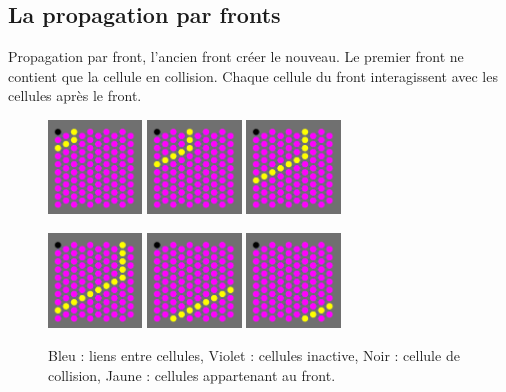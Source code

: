 \documentclass{beamer}
\begin{document}
\subsection{La propagation par fronts}
\begin{frame}
  Propagation par front, l’ancien front créer le nouveau. Le premier front ne contient que la cellule en collision.
  Chaque cellule du front interagissent avec les cellules après le front.
  \begin{figure}
    \begin{center}
      \includegraphics[width=2.5cm]{Images/front_1.png}
      \includegraphics[width=2.5cm]{Images/front_2.png}
      \includegraphics[width=2.5cm]{Images/front_3.png}
    \end{center}
    \begin{center}
      \includegraphics[width=2.5cm]{Images/front_4.png}
      \includegraphics[width=2.5cm]{Images/front_5.png}
      \includegraphics[width=2.5cm]{Images/front_6.png}
    \end{center}

    \caption{Bleu : liens entre cellules, Violet : cellules inactive, Noir : cellule de collision, Jaune : cellules appartenant au front.}
  \end{figure}
\end{frame}
\end{document}
